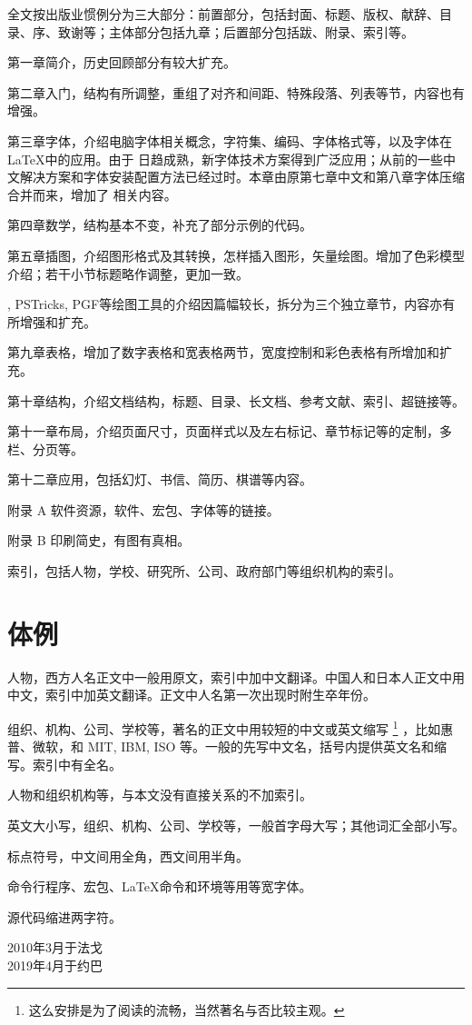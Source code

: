 \begin{compactenum}
  \item 全文按出版业惯例分为三大部分：前置部分，包括封面、标题、版权、献辞、目录、序、致谢等；主体部分包括九章；后置部分包括跋、附录、索引等。
  \item 第一章简介，历史回顾部分有较大扩充。
  \item 第二章入门，结构有所调整，重组了对齐和间距、特殊段落、列表等节，内容也有增强。
  \item 第三章字体，介绍电脑字体相关概念，字符集、编码、字体格式等，以及字体在 \LaTeX 中的应用。由于 \XeTeX 日趋成熟，新字体技术方案得到广泛应用；从前的一些中文解决方案和字体安装配置方法已经过时。本章由原第七章中文和第八章字体压缩合并而来，增加了 \XeTeX 相关内容。
  \item 第四章数学，结构基本不变，补充了部分示例的代码。
  \item 第五章插图，介绍图形格式及其转换，怎样插入图形，矢量绘图。增加了色彩模型介绍；若干小节标题略作调整，更加一致。
  \item \MP, PSTricks, PGF等绘图工具的介绍因篇幅较长，拆分为三个独立章节，内容亦有所增强和扩充。
  \item 第九章表格，增加了数字表格和宽表格两节，宽度控制和彩色表格有所增加和扩充。
  \item 第十章结构，介绍文档结构，标题、目录、长文档、参考文献、索引、超链接等。
  \item 第十一章布局，介绍页面尺寸，页面样式以及左右标记、章节标记等的定制，多栏、分页等。
  \item 第十二章应用，包括幻灯、书信、简历、棋谱等内容。
  \item 附录 A 软件资源，软件、宏包、字体等的链接。
  \item 附录 B 印刷简史，有图有真相。
  \item 索引，包括人物，学校、研究所、公司、政府部门等组织机构的索引。
\end{compactenum}

\section*{体例}

\begin{compactenum}
  \item 人物，西方人名正文中一般用原文，索引中加中文翻译。中国人和日本人正文中用中文，索引中加英文翻译。正文中人名第一次出现时附生卒年份。
  \item 组织、机构、公司、学校等，著名的正文中用较短的中文或英文缩写 \footnote{这么安排是为了阅读的流畅，当然著名与否比较主观。} ，比如惠普、微软，和 MIT, IBM, ISO 等。一般的先写中文名，括号内提供英文名和缩写。索引中有全名。
  \item 人物和组织机构等，与本文没有直接关系的不加索引。
  \item 英文大小写，组织、机构、公司、学校等，一般首字母大写；其他词汇全部小写。
  \item 标点符号，中文间用全角，西文间用半角。
  \item 命令行程序、宏包、\LaTeX 命令和环境等用等宽字体。
  \item 源代码缩进两字符。
\end{compactenum}

\begin{flushright}
  2010年3月于法戈\\
  2019年4月于约巴
\end{flushright}
